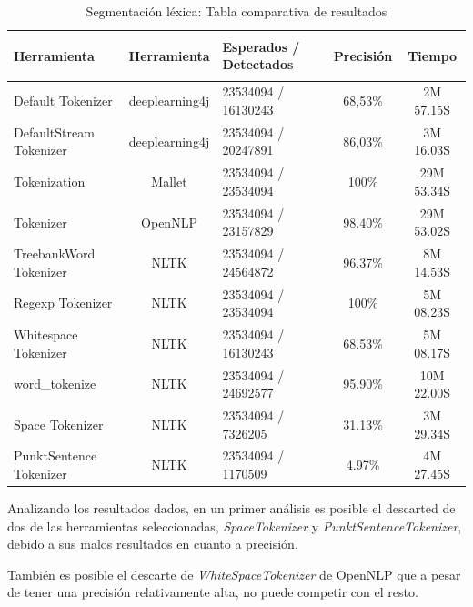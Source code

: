 \documentclass[runningheads,a4paper]{llncs}
\theoremstyle{break}
\newcommand{\rowstyle}[1]{\gdef\currentrowstyle{#1}%
  #1\ignorespaces
}
\begin{document}
\bgroup
\setlength{\tabcolsep}{12pt}
\def\arraystretch{1.5}
\begin{table}
\begin{tabular}{p{2cm}|c|p{3.2cm}|c|c}
\rowstyle{\bfseries}
Herramienta & \rowstyle{\bfseries} Herramienta & \rowstyle{\bfseries} Esperados /  \newline Detectados  & \rowstyle{\bfseries} Precisión  & \rowstyle{\bfseries} Tiempo\\ \hline
Default \newline Tokenizer       & deeplearning4j& 23534094 / 16130243 & 68,53\% & 2M 57.15S \\
DefaultStream \newline Tokenizer & deeplearning4j& 23534094 / 20247891 & 86,03\% & 3M 16.03S \\ 
Tokenization            & Mallet        & 23534094 / 23534094 & 100\% & 29M 53.34S \\ 
Tokenizer               & OpenNLP     & 23534094 / 23157829 & 98.40\% & 29M 53.02S \\ 
TreebankWord Tokenizer  & NLTK       & 23534094 / 24564872 & 96.37\% & 8M 14.53S \\ 
Regexp  \newline Tokenizer        & NLTK       & 23534094 / 23534094 & 100\% & 5M 08.23S \\ 
Whitespace  \newline Tokenizer    & NLTK       & 23534094 / 16130243 & 68.53\% & 5M 08.17S \\
word\_tokenize            & NLTK  & 23534094 / 24692577 & 95.90\% & 10M 22.00S \\ 
Space  \newline Tokenizer & NLTK  & 23534094 /  7326205 & 31.13\% & 3M 29.34S \\ 
PunktSentence Tokenizer   & NLTK  & 23534094 /  1170509 & 4.97\% &  4M 27.45S \\ \hline
\end{tabular}
\vspace{1em}
\caption{Segmentación léxica: Tabla comparativa de resultados}
\end{table}
\egroup
\vspace{-1.5em}

Analizando los resultados dados, en un primer análisis es posible el descarted de dos de las herramientas seleccionadas, \textit{SpaceTokenizer} y \textit{PunktSentenceTokenizer},  debido a sus malos resultados en cuanto a precisión. 

También es posible el descarte de \textit{WhiteSpaceTokenizer} de OpenNLP que a pesar de tener una precisión relativamente alta, no puede competir con el resto. 
\end{document}

